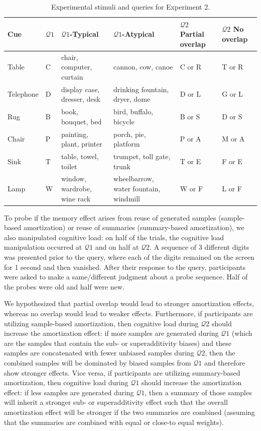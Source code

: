 \begin{table}
\caption{Experimental stimuli and queries for Experiment 2.}
\label{tab:scenarios2}
\centering
\begin{tabular}{p{} p{} >{\raggedright}p{} >{\raggedright}p{} p{} p{}}
  \toprule
\bf{Cue} & \bf{$\mathcal{Q}1$} & \bf{$\mathcal{Q}1$-Typical} & \bf{$\mathcal{Q}1$-Atypical}& \bf{$\mathcal{Q}2$ Partial overlap} &\bf{$\mathcal{Q}2$ No overlap}\tabularnewline
\midrule
Table & C & chair, computer, curtain & cannon, cow, canoe & C or R &T or R\tabularnewline

Telephone & D & display case, dresser, desk & drinking fountain, dryer, dome & D or L& G or L\tabularnewline

Rug & B & book, bouquet, bed & bird, buffalo, bicycle & B or S&D or S\tabularnewline

Chair & P & painting, plant, printer & porch, pie, platform & P or A&M or A\tabularnewline

Sink & T & table, towel, toilet & trumpet, toll gate, trunk &T or E&F or E\tabularnewline

Lamp & W & window, wardrobe, wine rack & wheelbarrow, water fountain, windmill & W or F & L or F\\
\bottomrule
\end{tabular}
\end{table}

To probe if the memory effect arises from reuse of generated samples (sample-based amortization) or reuse of summaries (summary-based amortization), we also manipulated cognitive load: on half of the trials, the cognitive load manipulation occurred at $\mathcal{Q}1$ and on half at $\mathcal{Q}2$. A sequence of 3 different digits was presented prior to the query, where each of the digits remained on the screen for 1 second and then vanished. After their response to the query, participants were asked to make a same/different judgment about a probe sequence. Half of the probes were old and half were new.

We hypothesized that partial overlap would lead to stronger amortization effects, whereas no overlap would lead to weaker effects. Furthermore, if participants are utilizing sample-based amortization, then cognitive load during $\mathcal{Q}2$ should increase the amortization effect: if more samples are generated during $\mathcal{Q}1$ (which are the samples that contain the sub- or superadditivity biases) and these samples are concatenated with fewer unbiased samples during $\mathcal{Q}2$, then the combined samples will be dominated by biased samples from $\mathcal{Q}1$ and therefore show stronger effects. Vice versa, if participants are utilizing summary-based amortization, then cognitive load during $\mathcal{Q}1$ should increase the amortization effect: if less samples are generated during $\mathcal{Q}1$, then a summary of those samples will inherit a stronger sub- or superadditivity effect such that the overall amortization effect will be stronger if the two summaries are combined (assuming that the summaries are combined with equal or close-to equal weights).

